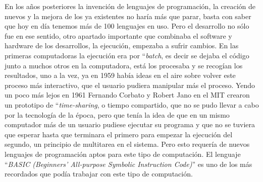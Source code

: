 \documentclass[letterpaper,12pt,oneside]{book}
\begin{document}

		En los años posteriores la invención de lenguajes de programación, la creación de nuevos y la mejora de los ya existentes no haría más que parar, basta con saber
		que hoy en día tenemos más de 100 lenguajes en uso. Pero el desarrollo no sólo fue en ese sentido, otro apartado importante que combinaba el software
		y hardware de los desarrollos, la ejecución, empezaba a sufrir cambios. En las primeras computadoras la ejecución era por ``\textit{batch}, es decir
		se dejaba el código junto a muchos otros en la computadora, está los procesaba y se recogían los resultados, uno a la vez, ya en 1959 había ideas
		en el aire sobre volver este proceso más interactivo, que el usuario pudiera manipular más el proceso. Yendo un poco más lejos en 1961
		Fernando Corbato y Robert Jano en el MIT crearon un prototipo de ``\textit{time-sharing}, o tiempo compartido, que no se pudo llevar a cabo por la tecnología
		de la época, pero que tenía la idea de que en un mismo computador más de un usuario pudiese ejecutar su programa y que no se tuviera
		que esperar hasta que terminara el primero para empezar la ejecución del segundo, un principio de multitarea en el sistema. Pero
		esto requería de nuevos lenguajes de programación aptos para este tipo de computación. El lenguaje ``\textit{BASIC (Beginners' All-purpose Symbolic Instruction 
		Code)}'' es uno de los más recordados que podía trabajar con este tipo de computación.
		
\end{document}
